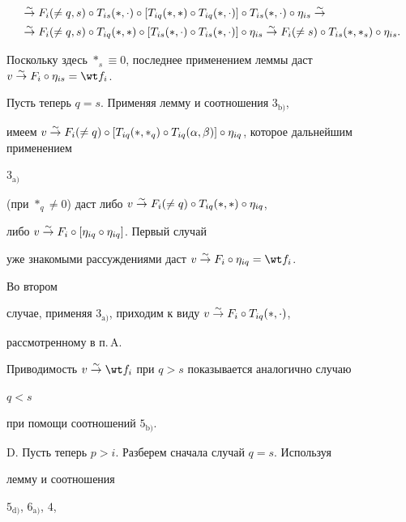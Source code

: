 \begin{pf}
\begin{align*}
&\simto F_i(\ne q,s)\circ T_{is}(*,\cdot)\circ[T_{iq}(*,*)\circ 


T_{iq}(*,\cdot)]\circ T_{is}(*,\cdot)\circ\eta_{is}\simto \\ 


&\simto F_i(\ne q,s)\circ T_{iq}(*,*)\circ[T_{is}(*,\cdot)\circ 


T_{is}(*,\cdot)]\circ\eta_{is}\simto F_i(\ne s)\circ 


T_{is}(*,*_s)\circ\eta_{is}. 


\end{align*} 


Поскольку здесь $*_s\equiv0$, последнее применением леммы даст $v\simto 


F_i\circ\eta_{is}=\wt f_i$. 


 


Пусть теперь $q=s$. Применяя лемму и соотношения $3_{\mathrm b)}$, 


имеем $v\simto F_i(\ne q)\circ[T_{iq}(*,*_q)\circ 


T_{iq}(\alpha,\beta)]\circ\eta_{iq}$, которое дальнейшим применением 


$3_{\mathrm a)}$ 


(при $*_q\ne0$) даст либо $v\simto F_i(\ne q)\circ 


T_{iq}(*,*)\circ\eta_{iq}$, 


либо $v\overset{\sim}{\to}{} F_i\circ[\eta_{iq}\circ\eta_{iq}]$. Первый случай 


уже знакомыми рассуждениями даст $v\simto F_i\circ\eta_{iq}=\wt f_i$. 


Во втором 


случае, применяя $3_{\mathrm a)}$, приходим к виду $v\simto 


F_i\circ T_{iq}(*,\cdot)$, 


рассмотренному в п.\,A. 


 


Приводимость $v\simto\wt f_i$ при $q>s$ показывается аналогично случаю 


$q<s$ 


при помощи соотношений $5_{\mathrm b)}$. 


 


D. Пусть теперь $p>i$. Разберем сначала случай $q=s$. Используя 


лемму и соотношения 


$5_{\mathrm d)}$, $6_{\mathrm a)}$, $4$, 



\end{pf}
